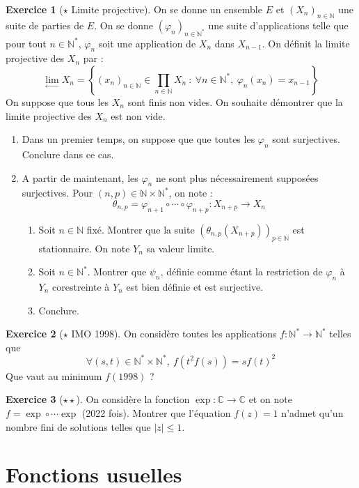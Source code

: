 \documentclass[french]{book}
\newcommand{\N}{\mathbb{N}}
\newcommand{\C}{\mathbb{C}}
\newcommand{\st}{^*}
\theoremstyle{definition}
\newtheorem{ex}{Exercice}[chapter]
\theoremstyle{theorem}
\theoremstyle{remark}
\begin{document}
\begin{ex}[$\star$ Limite projective]
	On se donne un ensemble $E$ et $(X_n)_{n\in\N}$ une suite de parties de $E$. On se donne $(\varphi_n)_{n\in\N\st}$ une suite d'applications telle que pour tout $n\in\N\st$, $\varphi_n$ soit une application de $X_n$ dans $X_{n-1}$. On définit la limite projective des $X_n$ par : $$\underset{\leftarrow}{\lim}X_n=\left\{(x_n)_{n\in\N}\in\prod_{n\in\N}X_n\ : \ \forall n\in\N\st,\ \varphi_n(x_n)=x_{n-1}\right\}$$ On suppose que tous les $X_n$ sont finis non vides. On souhaite démontrer que la limite projective des $X_n$ est non vide.
	\begin{enumerate}
		\item Dans un premier temps, on suppose que que toutes les $\varphi_n$ sont surjectives. Conclure dans ce cas.
		\item A partir de maintenant, les $\varphi_n$ ne sont plus nécessairement supposées surjectives. Pour $(n,p)\in\N\times\N\st$, on note : $$\theta_{n,p}=\varphi_{n+1}\circ\cdots\circ\varphi_{n+p}:X_{n+p}\longrightarrow X_n$$
		\begin{enumerate}[label=\alph*.]
			\item Soit $n\in\N$ fixé. Montrer que la suite $\left(\theta_{n,p}(X_{n+p})\right)_{p\in\N}$ est stationnaire. On note $Y_n$ sa valeur limite.
			\item Soit $n\in\N\st$. Montrer que $\psi_n$, définie comme étant la restriction de $\varphi_n$ à $Y_n$ corestreinte à $Y_n$ est bien définie et est surjective.
			\item Conclure.
		\end{enumerate}
	\end{enumerate}
\end{ex}

\begin{ex}[$\star$ IMO 1998]
	On considère toutes les applications $f:\N\st\to\N\st$ telles que $$\forall (s,t)\in\N\st\times\N\st,\ f(t^2f(s))=sf(t)^2$$ Que vaut au minimum $f(1998)$ ?
\end{ex}

\begin{ex}[$\star\star$]
	On considère la fonction $\exp:\C\to\C$ et on note $f=\exp\circ\cdots\exp$ (2022 fois). Montrer que l'équation $f(z)=1$ n'admet qu'un nombre fini de solutions telles que $\lvert z\rvert\leqslant 1$.
\end{ex}


\chapter{Fonctions usuelles}
\end{document}
